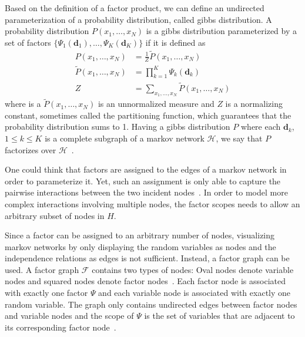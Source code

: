 Based on the definition of a \gls{factor product}, we can define an undirected parameterization of a \gls{probability distribution}, called \gls{gibbs distribution}.
A \gls{probability distribution} $P(x_1,\dots,x_N)$ is a \gls{gibbs distribution} parameterized by a set of \glspl{factor} $\{\Psi_1(\mathbf{d}_1),\dots,\Psi_K(\mathbf{d}_K)\}$ if it is defined as~\citep{koller2009probabilistic}
\begin{equation}
  \label{equ:gibbs-distribution}
  \begin{split}
  P\left(x_1,\dots,x_N\right) & =\frac{1}{Z}\tilde{P}\left(x_1,\dots,x_N\right) \\
  \tilde{P}\left(x_1,\dots,x_N\right) & =\prod_{k=1}^{K}\Psi_k\left(\mathbf{d}_k\right) \\
  Z & =\sum_{x_1,\ldots,x_N}\tilde{P}\left(x_1,\dots,x_N\right)
  \end{split}
\end{equation}
where is a $\tilde{P}(x_1,\dots,x_N)$ is an unnormalized measure and $Z$ is a normalizing constant, sometimes called the \gls{partitioning function}, which guarantees that the \gls{probability distribution} sums to 1.
Having a \gls{gibbs distribution} $P$ where each $\mathbf{d}_k$, $1\leq k \leq K$ is a complete subgraph of a \gls{markov network} $\mathcal{H}$, we say that $P$ factorizes over $\mathcal{H}$~\citep{koller2009probabilistic}.

One could think that \glspl{factor} are assigned to the edges of a \gls{markov network} in order to parameterize it.
Yet, such an assignment is only able to capture the pairwise interactions between the two incident nodes~\citep{koller2009probabilistic}.
In order to model more complex interactions involving multiple nodes, the \glspl{factor scope} needs to allow an arbitrary subset of nodes in $H$.

Since a factor can be assigned to an arbitrary number of nodes, visualizing \glspl{markov network} by only displaying the random variables as nodes and the independence relations as edges is not sufficient.
Instead, a \gls{factor graph} can be used.
A \gls{factor graph} $\mathcal{F}$ contains two types of nodes: Oval nodes denote variable nodes and squared nodes denote factor nodes~\citep{koller2009probabilistic}.
Each factor node is associated with exactly one factor $\Psi$ and each variable node is associated with exactly one random variable.
The graph only contains undirected edges between factor nodes and variable nodes and the scope of $\Psi$ is the set of variables that are adjacent to its corresponding factor node~\citep{koller2009probabilistic}.

